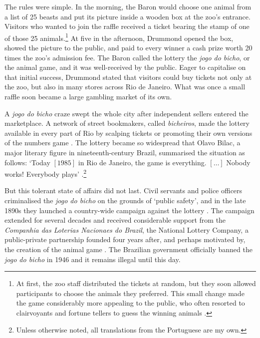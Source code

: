\documentclass[a4paper,12pt]{article}
\begin{document}
The rules were simple. In the morning, the Baron would choose one animal from a list of 25 beasts and put its picture inside a wooden box at the zoo's entrance. Visitors who wanted to join the raffle received a ticket bearing the stamp of one of those 25 animals.\footnote{At first, the zoo staff distributed the tickets at random, but they soon allowed participants to choose the animals they preferred. This small change made the game considerably more appealing to the public, who often resorted to clairvoyants and fortune tellers to guess the winning animals \citep[71--74]{da1999aguias}.} At five in the afternoon, Drummond opened the box, showed the picture to the public, and paid to every winner a cash prize worth 20 times the zoo's admission fee. The Baron called the lottery the \textit{jogo do bicho}, or the animal game, and it was well-received by the public. Eager to capitalise on that initial success, Drummond stated that visitors could buy tickets not only at the zoo, but also in many stores across Rio de Janeiro. What was once a small raffle soon became a large gambling market of its own. 

A \textit{jogo do bicho} craze swept the whole city after independent sellers entered the marketplace. A network of street bookmakers, called \textit{bicheiros}, made the lottery available in every part of Rio by scalping tickets or promoting their own versions of the numbers game \citep[37]{chazkel2011laws}. The lottery became so widespread that Olavo Bilac, a major literary figure in nineteenth-century Brazil, summarised the situation as follows: `Today $[1985]$ in Rio de Janeiro, the game is everything. $[\dots]$  Nobody works! Everybody plays' \citep[43]{pacheco1957antologia}.\footnote{Unless otherwise noted, all translations from the Portuguese are my own.} 

But this tolerant state of affairs did not last. Civil servants and police officers criminalised the \textit{jogo do bicho} on the grounds of `public safety', and in the late 1890s they launched a country-wide campaign against the lottery \citep{benatte2002jogos}. The campaign extended for several decades and received considerable support from the \textit{Companhia das Loterias Nacionaes do Brazil}, the National Lottery Company, a public-private partnership founded four years after, and perhaps motivated by, the creation of the animal game \citep[82]{da1999aguias}. The Brazilian government officially banned the \textit{jogo do bicho} in 1946 and it remains illegal until this day.  
 
\end{document}
